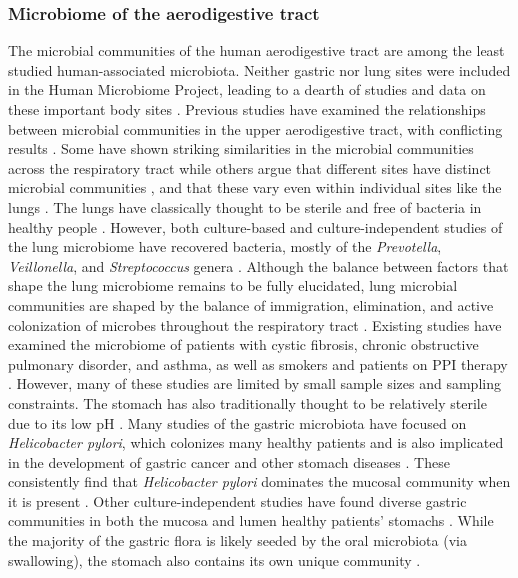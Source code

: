 \documentclass[12pt]{article}
\begin{document}
\subsubsection{Microbiome of the aerodigestive tract}
The microbial communities of the human aerodigestive tract are among the least 
studied human-associated microbiota. 
Neither gastric nor lung sites were included in the 
Human Microbiome Project, leading to a dearth of studies and data on 
these important body sites \cite{bassis-source-2015}. Previous studies have examined the relationships between microbial communities in  the upper 
aerodigestive tract, with conflicting results \cite{bassis-source-2015, almomani-cf_sputum-2016, rosen-ppi-2015, charslon-topographical-2011}. 
Some have shown striking similarities in the microbial
communities across the respiratory tract \cite{bassis-source-2015, almomani-cf_sputum-2016} while others
argue that different sites have distinct microbial communities \cite{rosen-ppi-2015},
and that these vary even within individual sites like the lungs \cite{erbdownward-copd-2011, dickson-spatial-2015}. The lungs have classically thought to be sterile and free of bacteria in 
healthy people \cite{bassis-source-2015, beck-lung-2012, charslon-topographical-2011}. 
However, both culture-based
and culture-independent studies of the lung microbiome have recovered
bacteria, mostly of the \textit{Prevotella}, \textit{Veillonella}, and \textit{Streptococcus} genera \cite{bassis-source-2015}. 
Although the balance between factors that shape the lung microbiome 
remains to be fully elucidated, lung microbial communities are shaped by the balance of
immigration, elimination, and active colonization of microbes 
throughout the respiratory tract \cite{bassis-source-2015, dickson-lung_microbiome-2014}.
Existing studies have examined the microbiome of patients with cystic fibrosis, chronic obstructive 
pulmonary disorder, and asthma, as well as smokers and patients on PPI therapy 
\cite{almomani-cf_sputum-2016, rosen-ppi-2015, erbdownward-copd-2011}.
However, many of these studies are limited by small sample sizes and sampling constraints. The stomach has also traditionally thought to be
relatively sterile due to its low pH \cite{lawson-gastric-2010}.
Many studies of the gastric microbiota have focused on \textit{Helicobacter pylori}, 
which colonizes many healthy patients and is also implicated in the development of gastric cancer and other stomach diseases \cite{bik-stomach-2006}.
These consistently find that \textit{Helicobacter pylori} dominates the mucosal 
community when it is present \cite{lawson-gastric-2010, bik-stomach-2006}.
Other culture-independent studies have found diverse gastric communities in 
both the mucosa and lumen healthy patients' stomachs \cite{bassis-source-2015, rosen-ppi-2015, lawson-gastric-2010}.
While the majority of the gastric flora is likely seeded by the
oral microbiota (via swallowing), 
the stomach also contains its own unique community \cite{bassis-source-2015, lawson-gastric-2010}.
\end{document}
